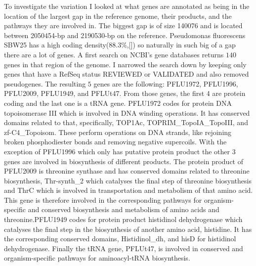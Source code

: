 \documentclass[a4paper,12pt]{article}
\begin{document}
To investigate the variation I looked at what genes are annotated as
being in the location of the largest gap in the reference genome,
their products, and the pathways they are involved in. The biggest gap
is of size 140076 and is located between 2050454-bp and 2190530-bp on the
reference. Pseudomonas fluorescens SBW25 has a high coding
density(88.3\%,[\cite{silby2009genomic}]) so naturally in such big of a
gap there are a lot of genes. A first search on NCBI's gene databases
returns $140$ genes in that region of the genome. I narrowed the
search down by keeping only genes that have a RefSeq status REVIEWED
or VALIDATED and also removed pseudogenes. The resulting $5$ genes are the following:
PFLU1972, PFLU1996, PFLU2009, PFLU1949, and PFLUt47. 
From those genes, the first 4 are protein coding and the last one is a tRNA
gene. PFLU1972 codes for protein DNA topoisomerase III which is
involved in DNA winding operations. It has conserved domains
related to that, specifically, TOP1Ac, TOPRIM\_TopoIA\_TopoIII, and
zf-C4\_Topoisom. These perform operations on DNA strands, like
rejoining broken phosphodiester bonds and removing negative
supercoils. With the exception of PFLU1996 which only has putative
protein product the other 3 genes are involved in biosynthesis of
different products. The protein product of PFLU2009 is threonine
synthase and has conserved domains related to threonine biosynthesis,
Thr-synth\_2 which catalyses the final step of threonine biosynthesis
and ThrC which is involved in transportation and metabolism of that
amino acid. This gene is therefore involved in the corresponding
pathways for organism-specific and conserved biosynthesis and
metabolism of amino acids and threonine.PFLU1949 codes for protein
product histidinol dehydrogenase which catalyses the final step in the
biosynthesis of another amino acid, histidine. It has the corresponding
conserved domains, Histidinol\_dh, and hisD for histidinol
dehydrogenase. Finally the tRNA gene, PFLUt47, is involved in
conserved and organism-specific pathways for aminoacyl-tRNA
biosynthesis.
\end{document}
